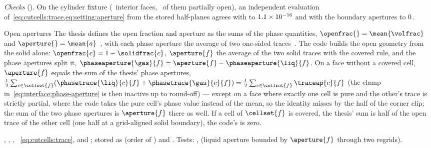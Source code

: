 \emph{Checks} (). On the cylinder fixture
(\chkCutFacesTotal\ interior faces, \chkCutFaces\ of them partially open), an
independent evaluation of~\cref{eq:cutcells:trace,eq:setting:aperture} from the
stored half-planes agrees with  to $1.1\times10^{-16}$
and with the boundary apertures to $0$.

\begin{deviation}{Open apertures}
The thesis defines the open fraction and aperture as the sums of the phase
quantities, $\openfrac{}=\mean{\volfrac}$ and
$\aperture{}=\mean{a}$~, with each phase aperture the average of
two one-sided traces~. The code builds the open geometry
from the solid alone: $\openfrac{c}=1-\solidfrac{c}$, $\aperture{f}$ the
average of the two solid traces with the covered rule, and the phase apertures
split it, $\phaseaperture{\gas}{f}=\aperture{f}-\phaseaperture{\liq}{f}$.
On a face without a covered cell, $\aperture{f}$ equals the sum of the thesis' phase
apertures, $\half\sum_{c\in\cellset{f}}(\phasetrace{\liq}{c}{f}+\phasetrace{\gas}{c}{f})
= \half\sum_{c\in\cellset{f}}\traceap{c}{f}$ (the clamp
in~\cref{eq:interface:phase-aperture} is then inactive up to round-off) --- except
on a face where exactly one cell is pure and the other's trace is strictly
partial, where the code takes the pure cell's phase value instead of the mean,
so the identity misses by the half of the corner clip; the sum of the two phase
apertures is $\aperture{f}$ there as well. If a cell of
$\cellset{f}$ is covered, the thesis' sum is half of the open trace of the other cell
(one half at a grid-aligned solid boundary), the code's is zero.
\end{deviation}

\begin{implnote}
,
,
,
~\cref{eq:cutcells:trace},
 and
; stored as
 (order of ) and .
Tests: ,
(liquid aperture bounded by $\aperture{f}$ through two regrids).
\end{implnote}

